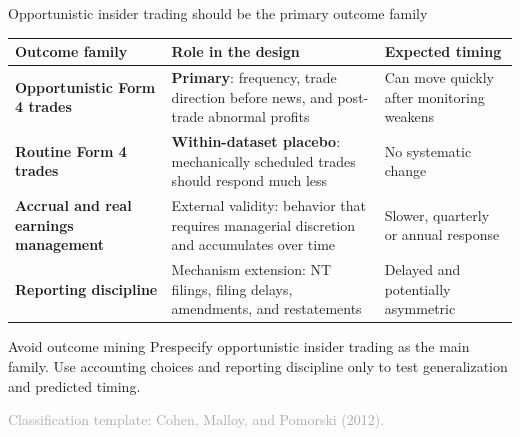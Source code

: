 \documentclass[aspectratio=169,10pt]{beamer}
\newcommand{\source}[1]{\vfill{\scriptsize\textcolor{DarkGray}{#1}}}
\begin{document}
\begin{frame}[t]{Opportunistic insider trading should be the primary outcome family}
\scriptsize
\renewcommand{\arraystretch}{1.18}
\setlength{\tabcolsep}{0.10cm}
\begin{tabularx}{\textwidth}{>{\bfseries\RaggedRight\arraybackslash}p{2.55cm} >{\RaggedRight\arraybackslash}X >{\RaggedRight\arraybackslash}X}
\toprule
Outcome family & Role in the design & Expected timing \\
\midrule
Opportunistic Form 4 trades & \textbf{Primary}: frequency, trade direction before news, and post-trade abnormal profits & Can move quickly after monitoring weakens \\
Routine Form 4 trades & \textbf{Within-dataset placebo}: mechanically scheduled trades should respond much less & No systematic change \\
Accrual and real earnings management & External validity: behavior that requires managerial discretion and accumulates over time & Slower, quarterly or annual response \\
Reporting discipline & Mechanism extension: NT filings, filing delays, amendments, and restatements & Delayed and potentially asymmetric \\
\bottomrule
\end{tabularx}

\begin{alertblock}{Avoid outcome mining}
\scriptsize Prespecify opportunistic insider trading as the main family. Use accounting choices and reporting discipline only to test generalization and predicted timing.
\end{alertblock}

\source{Classification template: Cohen, Malloy, and Pomorski (2012).}
\end{frame}
\end{document}
